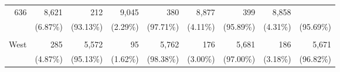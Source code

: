 \documentclass{article}
\begin{document}
\begin{tabular}{lllllllll}
  \multicolumn{1}{|r}{636} &
  \multicolumn{1}{r}{8,621} &
  \multicolumn{1}{r}{212} &
  \multicolumn{1}{r}{9,045} &
  \multicolumn{1}{r}{380} &
  \multicolumn{1}{r}{8,877} &
  \multicolumn{1}{r}{399} &
  \multicolumn{1}{r}{8,858} \\
\multicolumn{1}{r}{} &
  \multicolumn{1}{|r}{(6.87\%)} &
  \multicolumn{1}{r}{(93.13\%)} &
  \multicolumn{1}{r}{(2.29\%)} &
  \multicolumn{1}{r}{(97.71\%)} &
  \multicolumn{1}{r}{(4.11\%)} &
  \multicolumn{1}{r}{(95.89\%)} &
  \multicolumn{1}{r}{(4.31\%)} &
  \multicolumn{1}{r}{(95.69\%)} \\
\multicolumn{1}{r}{} &
  \multicolumn{1}{|r}{} &
  \multicolumn{1}{r}{} &
  \multicolumn{1}{r}{} &
  \multicolumn{1}{r}{} &
  \multicolumn{1}{r}{} &
  \multicolumn{1}{r}{} &
  \multicolumn{1}{r}{} &
  \multicolumn{1}{r}{} \\
\multicolumn{1}{r}{West\hspace{1em}} &
  \multicolumn{1}{|r}{285} &
  \multicolumn{1}{r}{5,572} &
  \multicolumn{1}{r}{95} &
  \multicolumn{1}{r}{5,762} &
  \multicolumn{1}{r}{176} &
  \multicolumn{1}{r}{5,681} &
  \multicolumn{1}{r}{186} &
  \multicolumn{1}{r}{5,671} \\
\multicolumn{1}{r}{} &
  \multicolumn{1}{|r}{(4.87\%)} &
  \multicolumn{1}{r}{(95.13\%)} &
  \multicolumn{1}{r}{(1.62\%)} &
  \multicolumn{1}{r}{(98.38\%)} &
  \multicolumn{1}{r}{(3.00\%)} &
  \multicolumn{1}{r}{(97.00\%)} &
  \multicolumn{1}{r}{(3.18\%)} &
  \multicolumn{1}{r}{(96.82\%)} \\
\cline{1-9}
\end{tabular}
\end{document}
